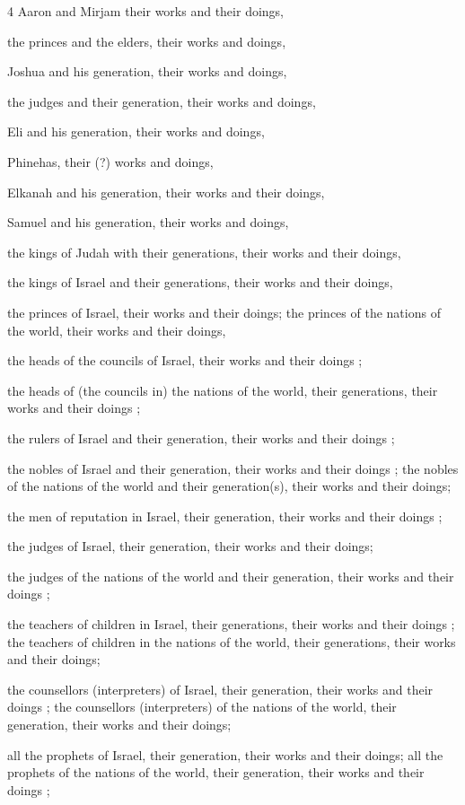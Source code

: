 \par 4 Aaron and Mirjam their works and their doings, 
\par the princes and the elders, their works and doings, 
\par Joshua and his generation, their works and doings, 
\par the judges and their generation, their works and doings,
\par Eli and his generation, their works and doings, 
\par Phinehas, their (?) works and doings,
\par Elkanah and his generation, their works and their doings, 
\par Samuel and his generation, their works and doings, 
\par the kings of Judah with their generations, their works and their doings, 
\par the kings of Israel and their generations, their works and their doings, 
\par the princes of Israel, their works and their doings; the princes of the nations of the world, their works and their doings, 
\par the heads of the councils of Israel, their works and their doings ; 
\par the heads of (the councils in) the nations of the world, their generations, their works and their doings ; 
\par the rulers of Israel and their generation, their works and their doings ; 
\par the nobles of Israel and their generation, their works and their doings ; the nobles of the nations of the world and their generation(s), their works and their doings;
\par the men of reputation in Israel, their generation, their works and their doings ;
\par the judges of Israel, their generation, their works and their doings; 
\par the judges of the nations of the world and their generation, their works and their doings ; 
\par the teachers of children in Israel, their generations, their works and their doings ; the teachers of children in the nations of the world, their generations, their works and their doings; 
\par the counsellors (interpreters) of Israel, their generation, their works and their doings ; the counsellors (interpreters) of the nations of the world, their generation, their works and their doings; 
\par all the prophets of Israel, their generation, their works and their doings; all the prophets of the nations of the world, their generation, their works and their doings ; 

